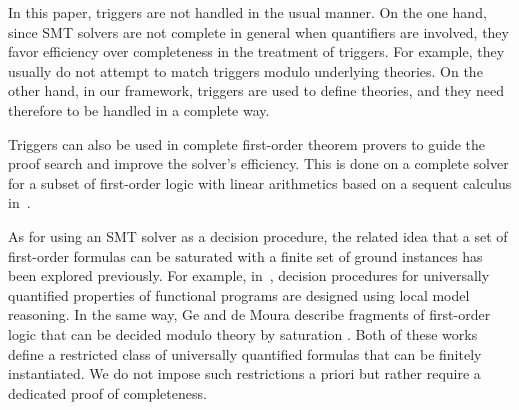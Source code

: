 \documentclass[]{easychair}
\begin{document}
In this paper, triggers are not handled in the usual manner. On the one
hand, since SMT solvers are not complete in general when quantifiers are
involved, they favor efficiency over completeness in the treatment of
triggers. For example, they usually do not attempt to match triggers modulo
underlying theories. On the other hand, in our framework, triggers are used
to define theories, and they need therefore to be handled in a complete way.

Triggers can also be used in complete first-order theorem provers to guide 
the proof search and improve the solver's efficiency. This is done on a
complete solver for a subset of first-order logic with linear arithmetics
based on a sequent calculus in~\cite{rummer2012matching}. 

As for using an SMT solver as a decision procedure, the related idea that a
set of first-order formulas can be saturated with
a finite set of ground instances has been explored previously.
For example, in~\cite{kuncak}, decision procedures for
universally quantified properties of functional programs are designed
using local model reasoning.
In the same way, Ge and de Moura describe
fragments of first-order logic that can be decided modulo theory 
by saturation \cite{MBQI}. Both of these works define a restricted class of
universally quantified formulas that can be finitely instantiated. We do not
impose such restrictions a priori but rather require a dedicated proof of
completeness.


%
\end{document}

